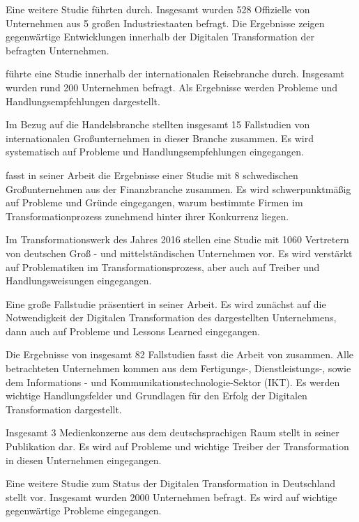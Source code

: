 Eine weitere Studie führten  durch. Insgesamt wurden 528 Offizielle von Unternehmen aus 5 großen Industriestaaten befragt. Die Ergebnisse zeigen gegenwärtige Entwicklungen innerhalb der Digitalen Transformation der befragten Unternehmen.

 führte eine Studie innerhalb der internationalen Reisebranche durch. Insgesamt wurden rund 200 Unternehmen befragt. Als Ergebnisse werden Probleme und Handlungsempfehlungen dargestellt.

Im Bezug auf die Handelsbranche stellten  insgesamt 15 Fallstudien von internationalen Großunternehmen in dieser Branche zusammen. Es wird systematisch auf Probleme und Handlungsempfehlungen eingegangen.

 fasst in seiner Arbeit die Ergebnisse einer Studie mit 8 schwedischen Großunternehmen aus der Finanzbranche zusammen. Es wird schwerpunktmäßig auf Probleme und Gründe eingegangen, warum bestimmte Firmen im Transformationprozess zunehmend hinter ihrer Konkurrenz liegen.

Im Transformationswerk des Jahres 2016 stellen  eine Studie mit 1060 Vertretern von deutschen Groß - und mittelständischen Unternehmen vor. Es wird  verstärkt auf Problematiken im Transformationsprozess, aber auch auf Treiber und Handlungsweisungen eingegangen.

Eine große Fallstudie präsentiert  in seiner Arbeit. Es wird zunächst auf die Notwendigkeit der Digitalen Transformation des dargestellten Unternehmens, dann auch auf Probleme und Lessons Learned eingegangen.

Die Ergebnisse von insgesamt 82 Fallstudien fasst die Arbeit von  zusammen. Alle betrachteten Unternehmen kommen aus dem Fertigungs-,  Dienstleistungs-,  sowie dem Informations - und Kommunikationstechnologie-Sektor (IKT). Es werden wichtige Handlungsfelder und Grundlagen für den Erfolg der Digitalen Transformation dargestellt.

Insgesamt 3 Medienkonzerne aus dem deutschsprachigen Raum stellt  in seiner Publikation dar. Es wird auf Probleme  und wichtige Treiber der Transformation in diesen Unternehmen eingegangen.

Eine weitere Studie zum Status der Digitalen Transformation in Deutschland stellt  vor. Insgesamt wurden 2000 Unternehmen befragt. Es wird auf wichtige gegenwärtige Probleme eingegangen.

